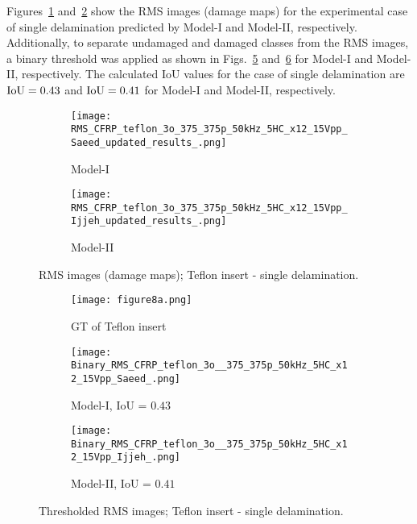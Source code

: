 \begin{sloppypar}
	Figures~\ref{fig:RMS_CFRP_Teflon_3o_saeed} and~\ref{fig:RMS_CFRP_Teflon_3o_ijjeh} show the RMS images (damage maps) for the experimental case of single delamination predicted by Model-I and Model-II, respectively.
	Additionally, to separate undamaged and damaged classes from the RMS images, a binary threshold was applied as shown in Figs.~\ref{fig:RMS_threshold_CFRP_Teflon_3o_saeed} and~\ref{fig:RMS_threshold_CFRP_Teflon_3o_ijjeh} for Model-I and Model-II, respectively. 
	The calculated IoU values for the case of single delamination are \(\textup{IoU}=0.43\) and \(\textup{IoU}=0.41\) for Model-I and Model-II, respectively.
	
	\begin{figure} [!ht]
		\begin{subfigure}[b]{.48\textwidth}
			\centering
			\texttt{[image: RMS\_CFRP\_teflon\_3o\_375\_375p\_50kHz\_5HC\_x12\_15Vpp\_Saeed\_updated\_results\_.png]}
			\caption{Model-I}
			\label{fig:RMS_CFRP_Teflon_3o_saeed}
		\end{subfigure}
		\hfill
		\begin{subfigure}[b]{.48\textwidth}
			\centering
			\texttt{[image: RMS\_CFRP\_teflon\_3o\_375\_375p\_50kHz\_5HC\_x12\_15Vpp\_Ijjeh\_updated\_results\_.png]}
			\caption{Model-II} 
			\label{fig:RMS_CFRP_Teflon_3o_ijjeh}
		\end{subfigure}
		\caption{RMS images (damage maps); Teflon insert - single delamination.}
		\label{fig:RMS_CFRP_Teflon_3o_images}
	\end{figure} 

	\begin{figure} [!ht]
		\begin{subfigure}[b]{0.32\textwidth}
			\centering
			\texttt{[image: figure8a.png]}
			\caption{GT of Teflon insert}
			\label{fig:exp_CFRP_teflon_3o_GT}
		\end{subfigure}
		\hfill
		\begin{subfigure}[b]{.32\textwidth}
			\centering
			\texttt{[image: Binary\_RMS\_CFRP\_teflon\_3o\_\_375\_375p\_50kHz\_5HC\_x12\_15Vpp\_Saeed\_.png]}
			\caption{Model-I, IoU = \(0.43\)}
			\label{fig:RMS_threshold_CFRP_Teflon_3o_saeed}
		\end{subfigure}
		\hfill
		\begin{subfigure}[b]{.32\textwidth}
			\centering
			\texttt{[image: Binary\_RMS\_CFRP\_teflon\_3o\_\_375\_375p\_50kHz\_5HC\_x12\_15Vpp\_Ijjeh\_.png]}
			\caption{Model-II, IoU = \(0.41\)} 
			\label{fig:RMS_threshold_CFRP_Teflon_3o_ijjeh}
		\end{subfigure}
		\caption{Thresholded RMS images; Teflon insert - single delamination.}
		\label{fig:RMS_threshold_CFRP_Teflon_3o_images}
	\end{figure} 
	

\end{sloppypar}

